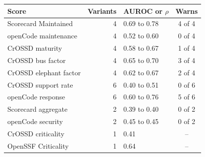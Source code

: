 \begin{tabular}{lrlc}
\toprule
Score & Variants & AUROC or $\rho$ & Warns \\
\midrule
Scorecard Maintained & 4 & 0.69 to 0.78 & 4 of 4 \\
openCode maintenance & 4 & 0.52 to 0.60 & 0 of 4 \\
CrOSSD maturity & 4 & 0.58 to 0.67 & 1 of 4 \\
CrOSSD bus factor & 4 & 0.65 to 0.70 & 3 of 4 \\
CrOSSD elephant factor & 4 & 0.62 to 0.67 & 2 of 4 \\
CrOSSD support rate & 6 & 0.40 to 0.51 & 0 of 6 \\
openCode response & 6 & 0.60 to 0.76 & 5 of 6 \\
Scorecard aggregate & 2 & 0.39 to 0.40 & 0 of 2 \\
openCode security & 2 & 0.45 to 0.45 & 0 of 2 \\
CrOSSD criticality & 1 & 0.41 & -- \\
OpenSSF Criticality & 1 & 0.64 & -- \\
\bottomrule
\end{tabular}
